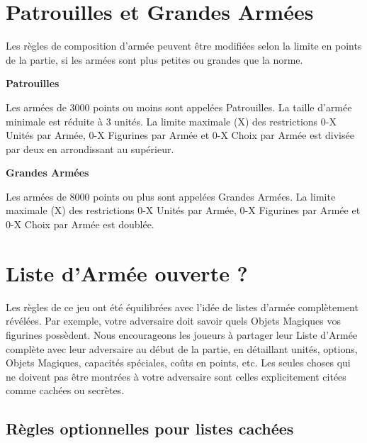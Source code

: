 \section{Patrouilles et Grandes Armées}

Les règles de composition d'armée peuvent être modifiées selon la limite en points de la partie, si les armées sont plus petites ou grandes que la norme.

\begin{multicols}{2}\raggedcolumns

\begin{center}\textbf{Patrouilles}\end{center}

Les armées de 3000 points ou moins sont appelées Patrouilles. La taille d'armée minimale est réduite à 3 unités. La limite maximale (X) des restrictions 0-X Unités par Armée, 0-X Figurines par Armée et 0-X Choix par Armée est divisée par deux en arrondissant au supérieur.

\columnbreak

\begin{center}\textbf{Grandes Armées}\end{center}

Les armées de 8000 points ou plus sont appelées Grandes Armées. La limite maximale (X) des restrictions 0-X Unités par Armée, 0-X Figurines par Armée et 0-X Choix par Armée est doublée.

\end{multicols}

\newpage
\section{Liste d'Armée ouverte ?}

Les règles de ce jeu ont été équilibrées avec l'idée de listes d'armée complètement révélées. Par exemple, votre adversaire doit savoir quels Objets Magiques vos figurines possèdent. Nous encourageons les joueurs à partager leur Liste d'Armée complète avec leur adversaire au début de la partie, en détaillant unités, options, Objets Magiques, capacités spéciales, coûts en points, etc. Les seules choses qui ne doivent pas être montrées à votre adversaire sont celles explicitement citées comme cachées ou secrètes.

\subsection{Règles optionnelles pour listes cachées}
\label{hidden_lists}

